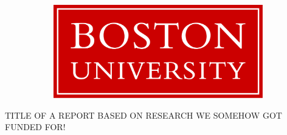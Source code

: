 \begin{titlepage}
    \pagecolor{bured}
    \noindent
    \fboxsep=1mm %
    \fboxrule=1.5pt %
    \begin{figure}[t]
        \centering
            \begin{subfigure}{.5\textwidth}
                \begin{flushleft}
                    \hspace{-6em}\includegraphics[height=.125\textheight]{images/BostonUni.png}
                \end{flushleft}
            \end{subfigure}%
            \begin{subfigure}{.5\textwidth}
            \end{subfigure}
        \end{figure}
    \color{white}
    \makebox[0pt][l]{\rule{1.3\textwidth}{2pt}}
    \par
    \noindent

    \begin{center}
        \vspace{10em}
        \huge{\uppercase{Title of a report based on research we somehow got funded for!}}\\
    \end{center}


\end{titlepage}
